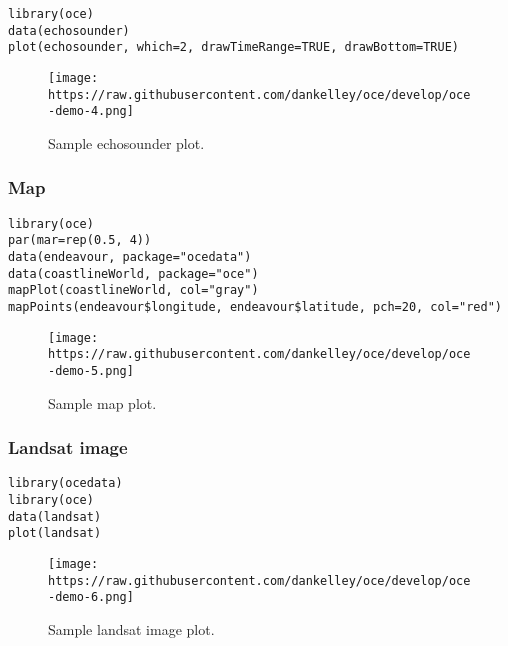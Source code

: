 \documentclass[
]{article}
\begin{document}
\begin{verbatim}
library(oce)
data(echosounder)
plot(echosounder, which=2, drawTimeRange=TRUE, drawBottom=TRUE)
\end{verbatim}

\begin{figure}
\centering
\texttt{[image: https://raw.githubusercontent.com/dankelley/oce/develop/oce-demo-4.png]}
\caption{Sample echosounder plot.}
\end{figure}

\hypertarget{map}{%
\subsubsection{Map}\label{map}}

\begin{verbatim}
library(oce)
par(mar=rep(0.5, 4))
data(endeavour, package="ocedata")
data(coastlineWorld, package="oce")
mapPlot(coastlineWorld, col="gray")
mapPoints(endeavour$longitude, endeavour$latitude, pch=20, col="red")
\end{verbatim}

\begin{figure}
\centering
\texttt{[image: https://raw.githubusercontent.com/dankelley/oce/develop/oce-demo-5.png]}
\caption{Sample map plot.}
\end{figure}

\hypertarget{landsat-image}{%
\subsubsection{Landsat image}\label{landsat-image}}

\begin{verbatim}
library(ocedata)
library(oce)
data(landsat)
plot(landsat)
\end{verbatim}

\begin{figure}
\centering
\texttt{[image: https://raw.githubusercontent.com/dankelley/oce/develop/oce-demo-6.png]}
\caption{Sample landsat image plot.}
\end{figure}
\end{document}
